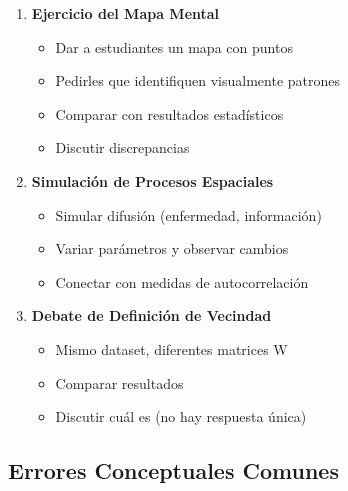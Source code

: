\documentclass[12pt,a4paper]{article}
\begin{document}
\begin{enumerate}
    \item \textbf{Ejercicio del Mapa Mental}
    \begin{itemize}
        \item Dar a estudiantes un mapa con puntos
        \item Pedirles que identifiquen visualmente patrones
        \item Comparar con resultados estadísticos
        \item Discutir discrepancias
    \end{itemize}
    
    \item \textbf{Simulación de Procesos Espaciales}
    \begin{itemize}
        \item Simular difusión (enfermedad, información)
        \item Variar parámetros y observar cambios
        \item Conectar con medidas de autocorrelación
    \end{itemize}
    
    \item \textbf{Debate de Definición de Vecindad}
    \begin{itemize}
        \item Mismo dataset, diferentes matrices W
        \item Comparar resultados
        \item Discutir cuál es  (no hay respuesta única)
    \end{itemize}
\end{enumerate}

\subsection{Errores Conceptuales Comunes}
\end{document}
